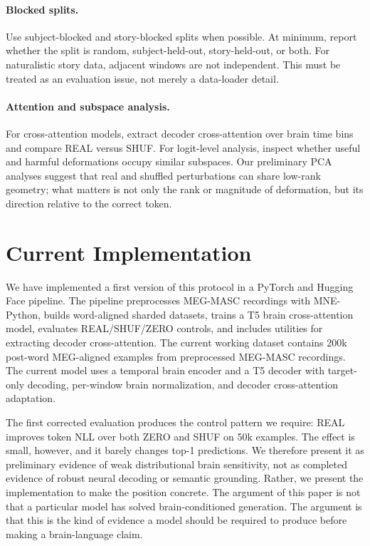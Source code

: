 \documentclass{article}
\begin{document}
\paragraph{Blocked splits.}
Use subject-blocked and story-blocked splits when possible.
At minimum, report whether the split is random, subject-held-out, story-held-out, or both.
For naturalistic story data, adjacent windows are not independent.
This must be treated as an evaluation issue, not merely a data-loader detail.

\paragraph{Attention and subspace analysis.}
For cross-attention models, extract decoder cross-attention over brain time bins and compare REAL versus SHUF.
For logit-level analysis, inspect whether useful and harmful deformations occupy similar subspaces.
Our preliminary PCA analyses suggest that real and shuffled perturbations can share low-rank geometry; what matters is not only the rank or magnitude of deformation, but its direction relative to the correct token.

\section{Current Implementation}

We have implemented a first version of this protocol in a PyTorch and Hugging Face pipeline.
The pipeline preprocesses MEG-MASC recordings with MNE-Python, builds word-aligned sharded datasets, trains a T5 brain cross-attention model, evaluates REAL/SHUF/ZERO controls, and includes utilities for extracting decoder cross-attention.
The current working dataset contains 200k post-word MEG-aligned examples from preprocessed MEG-MASC recordings.
The current model uses a temporal brain encoder and a T5 decoder with target-only decoding, per-window brain normalization, and decoder cross-attention adaptation.

The first corrected evaluation produces the control pattern we require: REAL improves token NLL over both ZERO and SHUF on 50k examples.
The effect is small, however, and it barely changes top-1 predictions.
We therefore present it as preliminary evidence of weak distributional brain sensitivity, not as completed evidence of robust neural decoding or semantic grounding.
Rather, we present the implementation to make the position concrete.
The argument of this paper is not that a particular model has solved brain-conditioned generation.
The argument is that this is the kind of evidence a model should be required to produce before making a brain-language claim.
\end{document}
